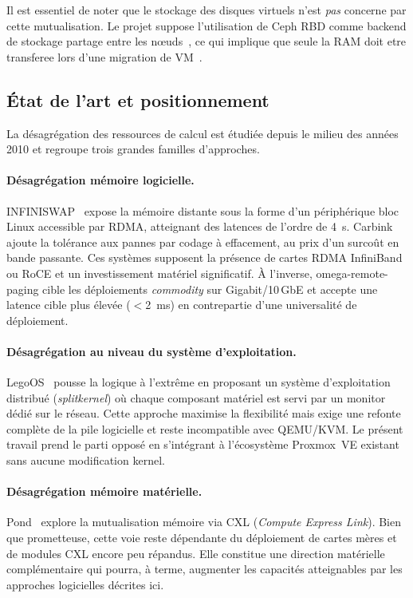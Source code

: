 Il est essentiel de noter que le stockage des disques virtuels n'est \textit{pas} concerne par cette mutualisation. Le projet suppose l'utilisation de Ceph RBD comme backend de stockage partage entre les nœuds~\cite{ceph_doc}, ce qui implique que seule la RAM doit etre transferee lors d'une migration de VM~\cite{clark_2005}.

\subsection{État de l'art et positionnement}
\label{subsec:etat-de-l-art}

La désagrégation des ressources de calcul est étudiée depuis le milieu des années 2010 et regroupe trois grandes familles d'approches.

\paragraph{Désagrégation mémoire logicielle.}
INFINISWAP~\cite{gu_2017_infiniswap} expose la mémoire distante sous la forme d'un périphérique bloc Linux accessible par RDMA, atteignant des latences de l'ordre de 4~\textmu{}s. Carbink~\cite{zhou_2022_carbink} ajoute la tolérance aux pannes par codage à effacement, au prix d'un surcoût en bande passante. Ces systèmes supposent la présence de cartes RDMA InfiniBand ou RoCE et un investissement matériel significatif. À l'inverse, omega-remote-paging cible les déploiements \textit{commodity} sur Gigabit/10\,GbE et accepte une latence cible plus élevée ($<$2~ms) en contrepartie d'une universalité de déploiement.

\paragraph{Désagrégation au niveau du système d'exploitation.}
LegoOS~\cite{shan_2018_legoos} pousse la logique à l'extrême en proposant un système d'exploitation distribué (\textit{splitkernel}) où chaque composant matériel est servi par un monitor dédié sur le réseau. Cette approche maximise la flexibilité mais exige une refonte complète de la pile logicielle et reste incompatible avec QEMU/KVM. Le présent travail prend le parti opposé en s'intégrant à l'écosystème Proxmox~VE existant sans aucune modification kernel.

\paragraph{Désagrégation mémoire matérielle.}
Pond~\cite{li_2023_pond} explore la mutualisation mémoire via CXL (\textit{Compute Express Link}). Bien que prometteuse, cette voie reste dépendante du déploiement de cartes mères et de modules CXL encore peu répandus. Elle constitue une direction matérielle complémentaire qui pourra, à terme, augmenter les capacités atteignables par les approches logicielles décrites ici.

